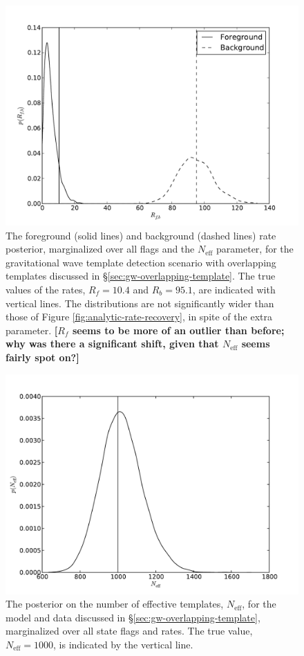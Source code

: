 \documentclass[aps,prd]{revtex4-1}
\newcommand{\ilya}[1]{{\color{red} \bf #1}}
\begin{document}
\begin{figure}
  \includegraphics[width=\columnwidth]{rates-nt}
  \caption{\label{fig:rates-nt} The foreground (solid lines) and
    background (dashed lines) rate posterior, marginalized over all
    flags and the $N_\mathrm{eff}$ parameter, for the gravitational
    wave template detection scenario with overlapping templates
    discussed in \S \ref{sec:gw-overlapping-template}.  The true
    values of the rates, $R_f = 10.4$ and $R_b=95.1$, are indicated
    with vertical lines.  The distributions are not significantly
    wider than those of Figure \ref{fig:analytic-rate-recovery}, in
    spite of the extra parameter.  \ilya{[$R_f$ seems to be more of an
        outlier than before; why was there a significant shift, given
        that $N_\mathrm{eff}$ seems fairly spot on?]}}
\end{figure}

\begin{figure}
  \includegraphics[width=\columnwidth]{ntemplates}
  \caption{\label{fig:ntemplates} The posterior on the number of
    effective templates, $N_\mathrm{eff}$, for the model and data
    discussed in \S \ref{sec:gw-overlapping-template}, marginalized
    over all state flags and rates.  The true value, $N_\mathrm{eff} =
    1000$, is indicated by the vertical line.}
\end{figure}
\end{document}
